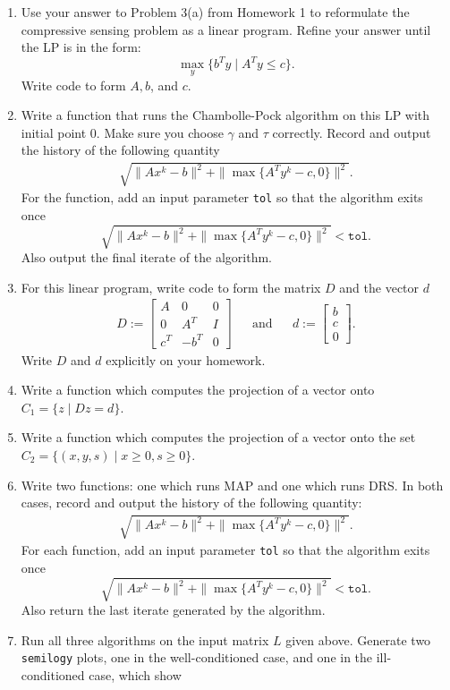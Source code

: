 \documentclass[11pt]{article}
\begin{document}
\begin{enumerate}
\begin{enumerate}
\item Use your answer to Problem 3(a) from Homework 1 to reformulate the compressive sensing problem as a linear program. Refine your answer until the LP is in the form: 
$$
\max_y \{b^T y \mid A^Ty  \leq c\}.
$$
Write code to form $A, b$, and $c$.
\item Write a function that runs the Chambolle-Pock algorithm on this LP with initial point $0$. Make sure you choose $\gamma$ and $\tau$ correctly. Record and output the history of the following quantity
\begin{align*}
 \sqrt{\|Ax^k - b\|^2 + \|\max\{A^Ty^k - c, 0\}\|^2}.
\end{align*} 
For the function, add an input parameter \texttt{tol} so that the algorithm exits once 
$$
 \sqrt{\|Ax^k - b\|^2 + \|\max\{A^Ty^k - c, 0\}\|^2} < \texttt{tol}.
$$
Also output the final iterate of the algorithm.
\item For this linear program, write code to form the matrix $D$ and the vector $d$
\begin{align*}
D := \begin{bmatrix}
A & 0 & 0 \\
0 & A^T & I \\
c^T & - b^T & 0 
\end{bmatrix}
&& \text{and} && d := \begin{bmatrix} 
b \\
c \\ 
0
\end{bmatrix}.
\end{align*}
Write $D$ and $d$ explicitly on your homework.
\item Write a function which computes the projection of a vector onto $C_1 = \{ z \mid Dz = d\}$.
\item Write a function which computes the projection of a vector onto the set $C_2 = \{(x, y, s) \mid x \geq 0, s \geq 0\}$.
\item Write two functions: one which runs MAP and one which runs DRS. In both cases, record and output the history of the following quantity:
\begin{align*}
 \sqrt{\|Ax^k - b\|^2 + \|\max\{A^Ty^k - c, 0\}\|^2}.
\end{align*}
For each function, add an input parameter \texttt{tol} so that the algorithm exits once 
$$
 \sqrt{\|Ax^k - b\|^2 + \|\max\{A^Ty^k - c, 0\}\|^2} < \texttt{tol}.
$$
Also return the last iterate generated by the algorithm. 
\item Run all three algorithms on the input matrix $L$ given above. Generate two \texttt{semilogy} plots, one in the well-conditioned case, and one in the ill-conditioned case, which show 

\end{enumerate}
\end{enumerate}
\end{document}
